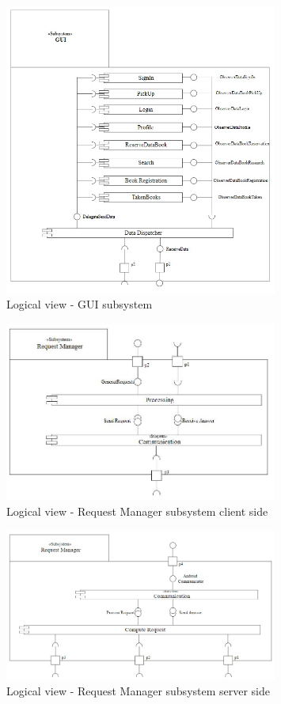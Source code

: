 \begin{figure}[h!]
	\centering
	\includegraphics[width=0.8\textwidth]{Immagini/GUI_subsys}
	\caption{Logical view - GUI subsystem}
	\label{fig:LogicalView_GUIsubsys}
\end{figure}
\begin{figure}[h!]
	\centering
	\includegraphics[width=0.8\textwidth]{Immagini/RequestManagerClient_subsys.JPG}
	\caption{Logical view - Request Manager subsystem client side}
	\label{fig:LogicalView_RMsubsys}
\end{figure}
\begin{figure}[h!]
	\centering
	\includegraphics[width=0.8\textwidth]{Immagini/RequestManagerSrv_subsys}
	\caption{Logical view - Request Manager subsystem server side}
	\label{fig:LogicalView_RM_server_subsys}
\end{figure}
